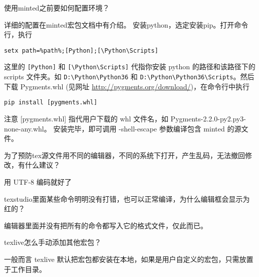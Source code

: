 \begin{faq}{使用minted之前要如何配置环境？}

详细的配置在minted宏包文档中有介绍。
安装python，选定安装pip。打开命令行，执行

\begin{verbatim}
setx path=%path%;[Python];[\Python\Scripts]
\end{verbatim}

这里的 \verb|[Python]| 和 \verb|[\Python\Scripts]| 代指你安装 python
的路径和该路径下的 scripts 文件夹。如 \verb|D:\Python\Python36| 和
\verb|D:\Python\Python36\Scripts|。然后下载 Pygments.whl (见网址
\url{http://pygments.org/download/})，在命令行中执行

\begin{verbatim}
pip install [pygments.whl]
\end{verbatim}

注意 {[}pygments.whl{]} 指代用户下载的 whl 文件名，如
Pygments-2.2.0-py2.py3-none-any.whl。 安装完毕，即可调用 -shell-escape
参数编译包含 minted 的源文件。

\end{faq}








\begin{faq}{为了预防tex源文件用不同的编辑器，不同的系统下打开，产生乱码，无法撤回修改，有什么建议？}

用 UTF-8 编码就好了
\end{faq}


\begin{faq}{texstudio里面某些命令明明没有打错，也可以正常编译，为什么编辑框会显示为红的？}

编辑器里面并没有把所有的命令都写入它的格式文件，仅此而已。
\end{faq}


\begin{faq}{texlive怎么手动添加其他宏包？}

一般而言 texlive
默认把宏包都安装在本地，如果是用户自定义的宏包，只需放置于工作目录。
\end{faq}











